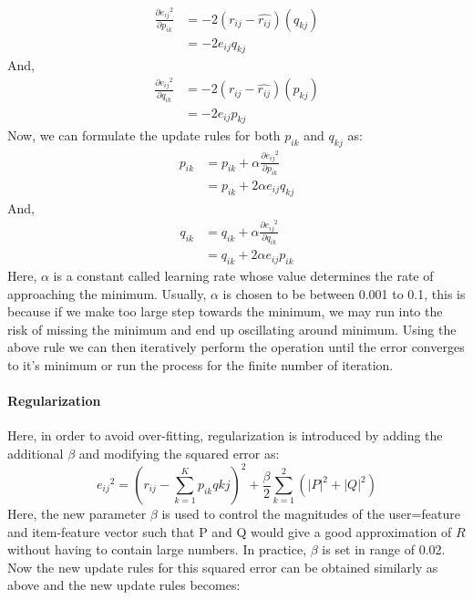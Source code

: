 \begin{equation}
\begin{split}
	\frac{\partial {e_{ij}}^2}{\partial p_{ik}} & = -2(r_{ij}-\widehat{r_{ij}})(q_{kj}) \\
	& = -2e_{ij}q_{kj}
\end{split}
\end{equation}
And,
\begin{equation}
\begin{split}
	\frac{\partial {e_{ij}}^2}{\partial q_{ik}} & = -2(r_{ij}-\widehat{r_{ij}})(p_{kj}) \\
	& = -2e_{ij}p_{kj}
\end{split}
\end{equation}
Now, we can formulate the update rules for both $p_{ik}$ and $q_{kj} $ as:
\begin{equation}
\begin{split}
	p_{ik} &= p_{ik} + \alpha \frac{\partial {e_{ij}}^2}{\partial p_{ik}} \\ 
	& = p_{ik}  + 2\alpha e_{ij} q_{kj}
\end{split}
\end{equation}
And,
\begin{equation}
\begin{split}
	q_{ik} &= q_{ik} + \alpha \frac{\partial {e_{ij}}^2}{\partial q_{ik}} \\ 
	& = q_{ik}  + 2\alpha e_{ij} p_{ik}
\end{split}
\end{equation}
Here, $\alpha$ is a constant called learning rate whose value determines the rate of approaching the minimum. Usually, $\alpha$ is chosen to be between 0.001 to 0.1, this is because if we make too large step towards the minimum, we may run into the risk of missing the minimum and end up oscillating around minimum.
Using the above rule we can then iteratively perform the operation until the error converges to it's minimum or run the process for the finite number of iteration.
\paragraph{Regularization}\hfill

Here, in order to avoid over-fitting, regularization is introduced by adding the additional $\beta$ and modifying the squared error as:
\begin{equation}
	{e_{ij}}^2  = (r_{ij} - \sum_{k=1}^K p_{ik}q{kj})^2 + \frac{\beta}{2}\sum_{k=1}^2(|P|^2 + |Q|^2)
\end{equation}
Here, the new parameter $\beta$ is used to control the magnitudes of the user=feature and item-feature vector such that P and Q would give a good approximation of $R$ without having to contain large numbers. In practice, $\beta$ is set in range of 0.02. Now the new update rules for this squared error can be obtained similarly as above and the new update rules becomes:

